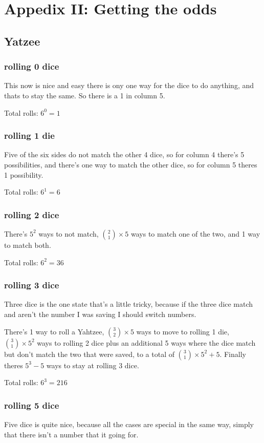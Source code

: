 \section{Appedix II: Getting the odds}

\subsection{Yatzee}

\subsubsection{rolling 0 dice}
This now is nice and easy there is ony one way for the dice to do anything, and thats to stay the same. So there is a 1 in column 5.

Total rolls: $6^0=1$
\subsubsection{rolling 1 die}
Five of the six sides do not match the other 4 dice, so for column 4 there's 5 possibilities, and there's one way to match the other dice, so for column 5 theres 1 possibility.

Total rolls: $6^1=6$
\subsubsection{rolling 2 dice}
There's $5^2$ ways to not match, ${2 \choose 1}\times5$ ways to match one of the two, and 1 way to match both.

Total rolls: $6^2=36$
\subsubsection{rolling 3 dice}
Three dice is the one state that's a little tricky, because if the three dice match and aren't the number I was saving I should switch numbers.

There's 1 way to roll a Yahtzee, ${3 \choose 2}\times5$ ways to move to rolling 1 die, ${3 \choose 1}\times5^2$ ways to rolling 2 dice plus an additional 5 ways where the dice match but don't match the two that were saved, to a total of ${3 \choose 1}\times5^2+5$. Finally theres $5^3-5$ ways to stay at rolling 3 dice.

Total rolls: $6^3=216$

\subsubsection{rolling 5 dice}
Five dice is quite nice, because all the cases are special in the same way, simply that there isn't a number that it going for.

